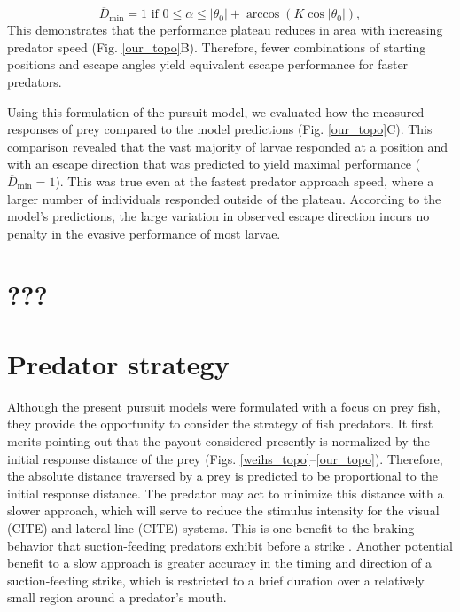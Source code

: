 \documentclass[12pt]{article}
\newcommand{\ol}{\overline}
\begin{document}
%
\begin{equation}
\ol D_{\text{min}}=1 \text{ if }  0 \leq \alpha  \leq  |\theta_0 |  + \arccos(K \cos | \theta_0 |),
 \end{equation}
%
This demonstrates that the performance plateau reduces in area with increasing predator speed (Fig. \ref{our_topo}B). Therefore, fewer combinations of starting positions and escape angles yield equivalent escape performance for faster predators.

Using this formulation of the pursuit model, we evaluated how the measured responses of prey compared to the model predictions (Fig. \ref{our_topo}C). This comparison revealed that the vast majority of larvae responded at a position and with an escape direction that was predicted to yield maximal performance  ($\ol D_{\text{min}}=1$). This was true even at the fastest predator approach speed, where a larger number of individuals responded outside of the plateau.  According to the model's predictions, the large variation in observed escape direction incurs no penalty in the evasive performance of most larvae. 

\section{???}



\section{Predator strategy}

Although the present pursuit models were formulated with a focus on prey fish, they provide the opportunity to consider the strategy of fish predators. It first merits pointing out that the payout considered presently is normalized by the initial response distance of the prey (Figs. \ref{weihs_topo}--\ref{our_topo}). Therefore, the absolute distance traversed by a prey is predicted to be proportional to the initial response distance. The predator may act to minimize this distance with a slower approach, which will serve to reduce the stimulus intensity for the visual (CITE) and lateral line (CITE) systems. This is one benefit to the braking behavior that suction-feeding predators exhibit before a strike \citep{Higham:2007go, Higham:2005iu}. Another potential benefit to a slow approach is greater accuracy in the timing and direction of a suction-feeding strike, which is restricted to a brief duration over a relatively small region around a predator's mouth. 
\end{document}
